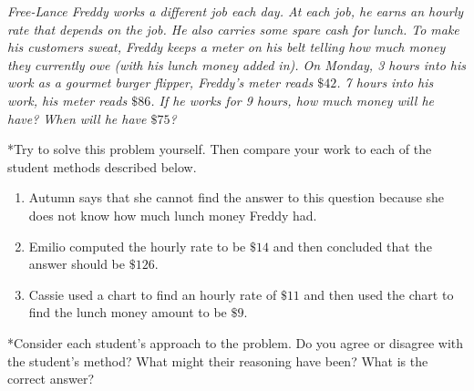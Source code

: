 \documentclass{ximera}
\begin{document}
\begin{problem}
 \emph{Free-Lance Freddy works a different job each day.  At each job, he earns an hourly rate that depends on the
job.  He also carries some spare cash for lunch.  To make his
customers sweat, Freddy keeps a meter on his belt telling how much
money they currently owe (with his lunch money added in).  On Monday, 3 hours into his work as a gourmet burger flipper,
  Freddy's meter reads $\$42$. 7 hours into his work, his meter reads
  $\$86$.  If he works for 9 hours, how much money will he have?  When
  will he have $\$75$?}

*Try to solve this problem yourself.  Then compare your work to each of the student methods described below.  

\begin{enumerate}
\item Autumn says that she cannot find the answer to this question because she does not know how much lunch money Freddy had.
\item Emilio computed the hourly rate to be $\$14$ and then concluded that the answer should be $\$126$.
\item Cassie used a chart to find an hourly rate of $\$11$ and then used the chart to find the lunch money amount to be $\$9$.

\end{enumerate}
*Consider each student's approach to the problem.  Do you agree or disagree with the student's method? What might their reasoning have been?  What is the correct answer?
\end{problem}

\newpage
\end{document}

